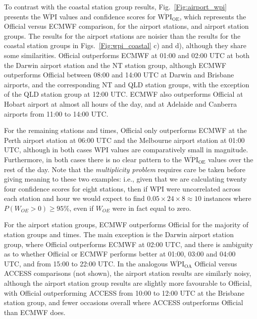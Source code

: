 \documentclass{ametsoc}
\begin{document}
To contrast with the coastal station group results, Fig.~\ref{Fig:airport_wpi} presents the $\overline{\text{WPI}}$ values and confidence scores for $\overline{\text{WPI}}_\text{OE}$, which represents the Official versus ECMWF comparison, for the airport stations, and airport station groups. The results for the airport stations are noisier than the results for the coastal station groups in Figs.~\ref{Fig:wpi_coastal} c) and d), although they share some similarities. Official outperforms ECMWF at 01:00 and 02:00 UTC at both the Darwin airport station and the NT station group, although ECMWF outperforms Official between 08:00 and 14:00 UTC at Darwin and Brisbane airports, and the corresponding NT and QLD station groups, with the exception of the QLD station group at 12:00 UTC. ECMWF also outperforms Official at Hobart airport at almost all hours of the day, and at Adelaide and Canberra airports from 11:00 to 14:00 UTC. 

For the remaining stations and times, Official only outperforms ECMWF at the Perth airport station at 06:00 UTC and the Melbourne airport station at 01:00 UTC, although in both cases WPI values are comparatively small in magnitude. Furthermore, in both cases there is no clear pattern to the $\overline{\text{WPI}}_\text{OE}$ values over the rest of the day. Note that the \textit{multiplicity problem} \citep[p. 178]{wilks11} requires care be taken before giving meaning to these two examples: i.e., given that we are calculating twenty four confidence scores for eight stations, then if WPI were uncorrelated across each station and hour we would expect to find $0.05 \times 24 \times 8 \approx 10$ instances where $P\left(W_{OE}>0\right)\geq 95\%$, even if $W_{OE}$ were in fact equal to zero.

For the airport station groups, ECMWF outperforms Official for the majority of station groups and times. The main exception is the Darwin airport station group, where Official outperforms ECMWF at 02:00 UTC, and there is ambiguity as to whether Official or ECMWF performs better at 01:00, 03:00 and 04:00 UTC, and from 15:00 to 22:00 UTC. In the analogous $\overline{\text{WPI}}_\text{OA}$ Official versus ACCESS comparisons (not shown), the airport station results are similarly noisy, although the airport station group results are slightly more favourable to Official, with Official outperforming ACCESS from 10:00 to 12:00 UTC at the Brisbane station group, and fewer occasions overall where ACCESS outperforms Official than ECMWF does. 
\end{document}
